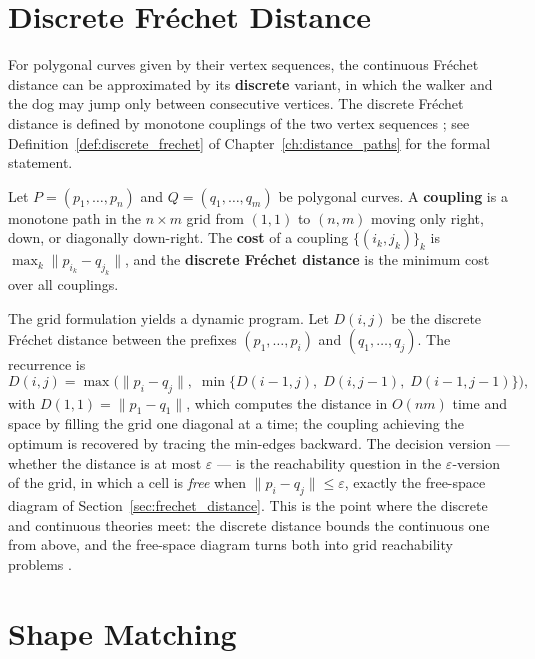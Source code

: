 \section{Discrete Fr\'echet Distance}
\label{sec:matching_discrete_frechet}

For polygonal curves given by their vertex
sequences, the continuous Fr\'echet distance can be approximated by its
\textbf{discrete} variant, in which the walker and the dog may jump only
between consecutive vertices. The discrete Fr\'echet distance is defined by
monotone couplings of the two vertex sequences \cite{eiter1994}; see
Definition~\ref{def:discrete_frechet} of Chapter~\ref{ch:distance_paths} for
the formal statement.

\begin{definition}\label{def:match_discrete_frechet_grid}
  Let $P = (p_1, \dots, p_n)$ and $Q = (q_1, \dots, q_m)$ be polygonal
  curves. A \textbf{coupling} is a monotone path in the $n \times m$ grid
  from $(1,1)$ to $(n,m)$ moving only right, down, or diagonally down-right.
  The \textbf{cost} of a coupling $\{(i_k, j_k)\}_{k}$ is
  $\max_k \|p_{i_k} - q_{j_k}\|$, and the \textbf{discrete Fr\'echet
  distance} is the minimum cost over all couplings.
\end{definition}

The grid formulation yields a dynamic program. Let $D(i,j)$ be the discrete
Fr\'echet distance between the prefixes $(p_1, \dots, p_i)$ and $(q_1,
\dots, q_j)$. The recurrence is
\[
  D(i,j) = \max\bigl( \|p_i - q_j\| ,\; \min\{ D(i-1,j),\; D(i,j-1),\;
  D(i-1,j-1) \} \bigr) ,
\]
with $D(1,1) = \|p_1 - q_1\|$, which computes the distance in $O(nm)$ time
and space by filling the grid one diagonal at a time; the coupling achieving
the optimum is recovered by tracing the min-edges backward. The decision
version --- whether the distance is at most $\varepsilon$ --- is the
reachability question in the $\varepsilon$-version of the grid, in which a
cell is \emph{free} when $\|p_i - q_j\| \le \varepsilon$, exactly the
free-space diagram of Section~\ref{sec:frechet_distance}. This is the point
where the discrete and continuous theories meet: the discrete distance
bounds the continuous one from above, and the free-space diagram turns both
into grid reachability problems \cite{alt1995,eiter1994}.


\section{Shape Matching}
\label{sec:matching_shape}

